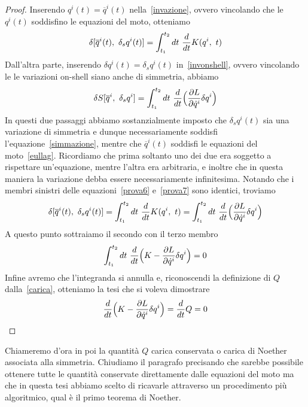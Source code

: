     \begin{proof}
        Inserendo $q^i(t) = \overline q^i(t)$ nella~\eqref{invazione}, ovvero vincolando che le $q^i(t)$ soddisfino le equazioni del moto, otteniamo 
    \begin{equation}\label{prova6}
        \delta[\overline q^i(t), ~\delta_s q^i(t)] = \int_{t_1}^{t_2}dt~ \frac{d}{dt} K(q^i, ~t)
    \end{equation}
        Dall'altra parte, inserendo $\delta q^i(t) = \delta_s q^i(t)$ in~\eqref{invonshell}, ovvero vincolando le le variazioni on-shell siano anche di simmetria, abbiamo
    \begin{equation}\label{prova7}
        \delta S[\overline q^i,~\delta_s q^i] = \int_{t_1}^{t_2}dt~ \frac{d}{dt} \Big( \frac{\partial L}{\partial\dot q^i} \delta q^i \Big )
    \end{equation}
        In questi due passaggi abbiamo sostanzialmente imposto che $\delta_s q^i(t)$ sia una variazione di simmetria e dunque necessariamente soddisfi l'equazione~\eqref{simmazione}, mentre che $\overline q^i(t)$ soddisfi le equazioni del moto~\eqref{eullag}. Ricordiamo che prima soltanto uno dei due era soggetto a rispettare un'equazione, mentre l'altra era arbitraria, e inoltre che in questa maniera la variazione debba essere necessariamente infinitesima. Notando che i membri sinistri delle equazioni~\eqref{prova6} e~\eqref{prova7} sono identici, troviamo
    \begin{equation*}
        \delta[\overline q^i(t), ~\delta_s q^i(t)] = \int_{t_1}^{t_2}dt~ \frac{d}{dt} K(q^i, ~t) = \int_{t_1}^{t_2}dt~ \frac{d}{dt} \Big( \frac{\partial L}{\partial\dot q^i} \delta q^i \Big )
    \end{equation*}
        A questo punto sottraiamo il secondo con il terzo membro
    \begin{equation*}
        \int_{t_1}^{t_2}dt~ \frac{d}{dt} \Big (K - \frac{\partial L}{\partial\dot q^i} \delta q^i \Big ) = 0
    \end{equation*}
        Infine avremo che l'integranda si annulla e, riconoscendi la definizione di $Q$ dalla~\eqref{carica}, otteniamo la tesi che si voleva dimostrare
    \begin{equation*}
        \frac{d}{dt} \Big (K - \frac{\partial L}{\partial\dot q^i} \delta q^i \Big ) = \frac{d}{dt} Q = 0
    \end{equation*}
    \end{proof}
    Chiameremo d'ora in poi la quantità $Q$ carica conservata o carica di Noether associata alla simmetria. Chiudiamo il paragrafo precisando che sarebbe possibile ottenere tutte le quantità conservate direttamente dalle equazioni del moto ma che in questa tesi abbiamo scelto di ricavarle attraverso un procedimento più algoritmico, qual è il primo teorema di Noether. 


